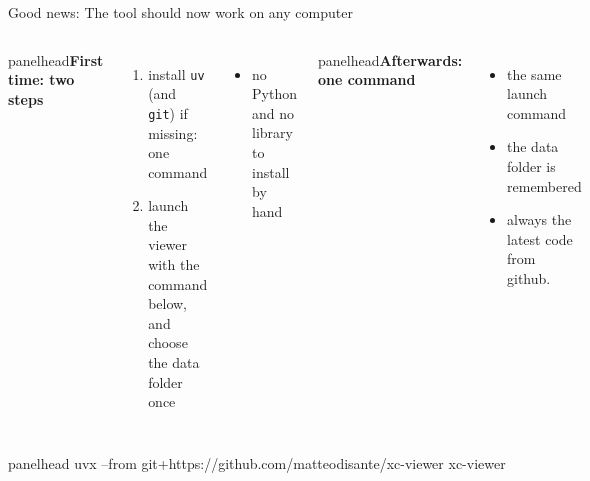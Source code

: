 \documentclass[11pt,aspectratio=169]{beamer}
\newcommand{\panelhead}[1]{%
  \begin{beamercolorbox}[wd=\linewidth,sep=5pt]{panelhead}\textbf{#1}\end{beamercolorbox}\par\vspace{2mm}}
\begin{document}
\begin{frame}[plain]
\end{frame}

\begin{frame}{Good news: The tool should now work on any computer}
\begin{columns}[T,onlytextwidth]
\panelhead{First time: two steps}
\begin{enumerate}
  \item install \texttt{uv} (and \texttt{git}) if missing: one command
  \item launch the viewer with the command below, and choose the data folder once
\end{enumerate}
\begin{itemize}
  \item no Python and no library to install by hand
\end{itemize}
\panelhead{Afterwards: one command}
\begin{itemize}
  \item the same launch command
  \item the data folder is remembered
  \item always the latest code from github.
\end{itemize}
\end{columns}
\vfill
\begin{beamercolorbox}[wd=\linewidth,sep=5pt,center]{panelhead}
\ttfamily\small uvx --from git+https://github.com/matteodisante/xc-viewer xc-viewer
\end{beamercolorbox}
\end{frame}
\end{document}
